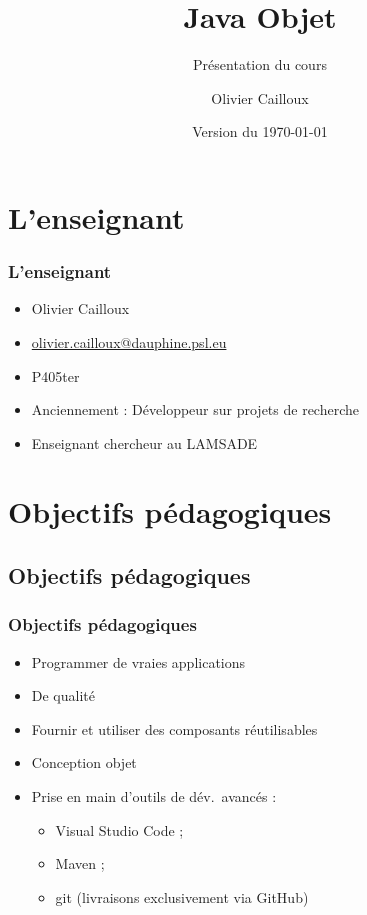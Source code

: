 \documentclass[english, french]{beamer}
\title{Java Objet}
\subtitle{Présentation du cours}
\author{Olivier Cailloux}
\institute[LAMSADE]{LAMSADE, Université Paris-Dauphine}
\date{Version du \today}
\begin{document}


\begin{frame}[plain]
   \titlepage
\end{frame}
\addtocounter{framenumber}{-1}

\section{L’enseignant}
\begin{frame}
	\frametitle{L’enseignant}
	\begin{itemize}
		\item Olivier Cailloux
		\item \href{mailto:olivier.cailloux@dauphine.psl.eu}{olivier.cailloux@dauphine.psl.eu}
		\item P405ter
		\item Anciennement : Développeur sur projets de recherche
		\item Enseignant chercheur au LAMSADE
	\end{itemize}
\end{frame}

\section[Obj. pédagogiques]{Objectifs pédagogiques}
\subsection{Objectifs pédagogiques}
\begin{frame}
	\frametitle{Objectifs pédagogiques}
	\begin{itemize}
		\item Programmer de \og{}vraies\fg{} applications
		\item De qualité
		\item Fournir et utiliser des composants réutilisables
		\item Conception objet
		\item Prise en main d’outils de dév.\ avancés : 
		\begin{itemize}
			\item Visual Studio Code ;
			\item Maven ;
			\item git (livraisons exclusivement via GitHub)
		\end{itemize}
	\end{itemize}
\end{frame}
\end{document}
